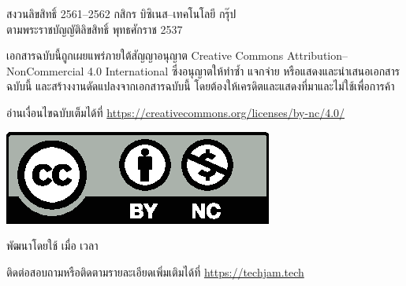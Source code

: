 \begin{small}
    \bigskip\noindent
    {\textcopyright} สงวนลิขสิทธิ์ 2561{\hrsp--\hrsp}2562\; กสิกร บิซิเนส{\hrsp--\hrsp}เทคโนโลยี กรุ๊ป \\
    ตามพระราชบัญญัติลิขสิทธิ์ พุทธศักราช 2537

    \smallskip\noindent
    เอกสารฉบับนี้ถูกเผยแพร่ภายใต้สัญญาอนุญาต Creative Commons Attribution--NonCommercial 4.0 International
    ซึ่งอนุญาตให้ทำซ้ำ แจกจ่าย หรือแสดงและนำเสนอเอกสารฉบับนี้ และสร้างงานดัดแปลงจากเอกสารฉบับนี้\;
    โดยต้องให้เครดิตและแสดงที่มาและไม่ใช้เพื่อการค้า

    \smallskip\noindent
    อ่านเงื่อนไขฉบับเต็มได้ที่\; \url{https://creativecommons.org/licenses/by-nc/4.0/} 

    \bigskip\noindent
    \includegraphics[width=0.190983\linewidth]{assets/by-nc.eps}

    \medskip\noindent
    พัฒนาโดยใช้ {\XeLaTeX} เมื่อ \texttt{\DTMtoday} เวลา \texttt{\DTMcurrenttime}

    \smallskip\noindent
    ติดต่อสอบถามหรือติดตามรายละเอียดเพิ่มเติมได้ที่\; \url{https://techjam.tech}
    
\end{small}
